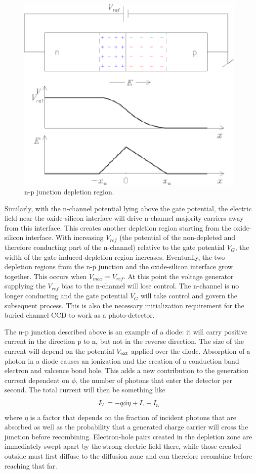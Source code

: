 \documentclass{article}
\begin{document}
\begin{figure}[h]
  \centering
	\includegraphics{CCD_junction.eps}
  \caption{n-p junction depletion region.}
  \label{CCD.figjunction}
\end{figure}

Similarly, with the n-channel potential lying above the gate
potential, the electric field near the oxide-silicon interface will
drive n-channel majority carriers away from this interface. This
creates another depletion region starting from the oxide-silicon
interface. With increasing $V_{ref}$ (the potential of the non-depleted
and therefore conducting part of the n-channel) relative to the gate
potential $V_G$, the width of the gate-induced depletion region
increases. Eventually, the two depletion regions from the n-p junction
and the oxide-silicon interface grow together. This occurs when
$V_{max} = V_{ref}$. At this point the voltage generator supplying the
$V_{ref}$ bias to the n-channel will lose control. The n-channel is
no longer conducting and the gate potential $V_G$ will take control
and govern the subsequent process. This is also the necessary
initialization requirement for the buried channel CCD to work as a
photo-detector.

The n-p junction described above is an example of a diode: it will
carry positive current in the direction p to n, but not in the reverse
direction. The size of the current will depend on the potential
$V_{\rm ext}$ applied over the diode.
Absorption of a photon in a diode causes an ionization and
the creation of a conduction band electron and valcence bond
hole. This adds a new contribution to the generation current dependent
on $\phi$, the number of photons that enter the detector per
second. The total current will then be something like
\[
I_{T}=-q\phi\eta+I_{\rm r}+I_{\rm g}
\]
where $\eta$ is a factor that depends on the fraction of incident
photons that are absorbed as well as the probability that a generated
charge carrier will cross the junction before
recombining. Electron-hole pairs created in the depletion zone are
immediately swept apart by the strong electric field there, while
those created outside must first diffuse to the diffusion zone and can
therefore recombine before reaching that far. 
\end{document}
